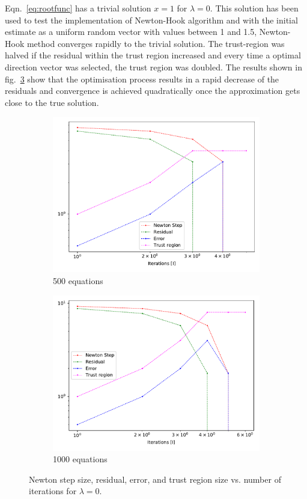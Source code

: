 \documentclass[11pt, oneside]{article}
\begin{document}
Eqn.~\eqref{eq:rootfunc} has a trivial solution $x = 1$ for $\lambda = 0$. This solution has been used to test the implementation of Newton-Hook algorithm and with the initial estimate as a uniform random vector with values between 1 and 1.5, Newton-Hook method converges rapidly to the trivial solution. The trust-region was halved if the residual within the trust region increased and every time a optimal direction vector was selected, the trust region was doubled. The results shown in fig.~\ref{fig:trivial} show that the optimisation process results in a rapid decrease of the residuals and convergence is achieved quadratically once the approximation gets close to the true solution.
\begin{figure}[h!]
  \centering
  \begin{subfigure}{.5\textwidth}
    \centering
    \includegraphics[width=1\linewidth]{figures/trivial_500.pdf}
    \caption{500 equations}
    \label{fig:trivial_1}
    \end{subfigure}%
  \begin{subfigure}{.5\textwidth}
    \centering
    \includegraphics[width=1\linewidth]{figures/trivial_1000.pdf}
    \caption{1000 equations}
    \label{fig:trivial_2}
  \end{subfigure}
  \caption{Newton step size, residual, error, and trust region size vs. number of iterations for $\lambda = 0$.}
  \label{fig:trivial}
\end{figure}
\end{document}
